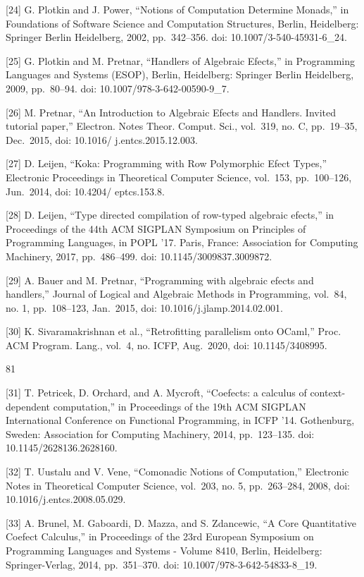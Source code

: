 \documentclass[
  10
]{article}
\begin{document}
{[}24{]} G. Plotkin and J. Power, ``Notions of Computation Determine
Monads,'' in Foundations of Software Science and Computation Structures,
Berlin, Heidelberg: Springer Berlin Heidelberg, 2002, pp.~342--356. doi:
10.1007/3-540-45931-6\_24.

{[}25{]} G. Plotkin and M. Pretnar, ``Handlers of Algebraic Efects,'' in
Programming Languages and Systems (ESOP), Berlin, Heidelberg: Springer
Berlin Heidelberg, 2009, pp.~80--94. doi: 10.1007/978-3-642-00590-9\_7.

{[}26{]} M. Pretnar, ``An Introduction to Algebraic Efects and Handlers.
Invited tutorial paper,'' Electron. Notes Theor. Comput. Sci., vol.~319,
no. C, pp.~19--35, Dec.~2015, doi: 10.1016/ j.entcs.2015.12.003.

{[}27{]} D. Leijen, ``Koka: Programming with Row Polymorphic Efect
Types,'' Electronic Proceedings in Theoretical Computer Science,
vol.~153, pp.~100--126, Jun.~2014, doi: 10.4204/ eptcs.153.8.

{[}28{]} D. Leijen, ``Type directed compilation of row-typed algebraic
efects,'' in Proceedings of the 44th ACM SIGPLAN Symposium on Principles
of Programming Languages, in POPL '17. Paris, France: Association for
Computing Machinery, 2017, pp.~486--499. doi: 10.1145/3009837.3009872.

{[}29{]} A. Bauer and M. Pretnar, ``Programming with algebraic efects
and handlers,'' Journal of Logical and Algebraic Methods in Programming,
vol.~84, no. 1, pp.~108--123, Jan.~2015, doi:
10.1016/j.jlamp.2014.02.001.

{[}30{]} K. Sivaramakrishnan et al., ``Retrofitting parallelism onto
OCaml,'' Proc. ACM Program. Lang., vol.~4, no. ICFP, Aug.~2020, doi:
10.1145/3408995.

81

{[}31{]} T. Petricek, D. Orchard, and A. Mycroft, ``Coefects: a calculus
of context-dependent computation,'' in Proceedings of the 19th ACM
SIGPLAN International Conference on Functional Programming, in ICFP '14.
Gothenburg, Sweden: Association for Computing Machinery, 2014,
pp.~123--135. doi: 10.1145/2628136.2628160.

{[}32{]} T. Uustalu and V. Vene, ``Comonadic Notions of Computation,''
Electronic Notes in Theoretical Computer Science, vol.~203, no. 5,
pp.~263--284, 2008, doi: 10.1016/j.entcs.2008.05.029.

{[}33{]} A. Brunel, M. Gaboardi, D. Mazza, and S. Zdancewic, ``A Core
Quantitative Coefect Calculus,'' in Proceedings of the 23rd European
Symposium on Programming Languages and Systems - Volume 8410, Berlin,
Heidelberg: Springer-Verlag, 2014, pp.~351--370. doi:
10.1007/978-3-642-54833-8\_19.
\end{document}
